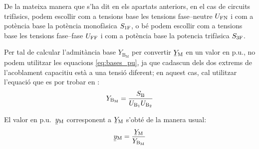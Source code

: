 De la mateixa manera que s'ha dit en els apartats anteriors, en el cas de circuits trif\`{a}sics, podem escollir com a tensions base les tensions fase--neutre $U_\mathrm{FN}$ i com a pot\`{e}ncia base la pot\`{e}ncia  monof\`{a}sica $S_\mathrm{1F}$, o b\'{e} podem escollir com a tensions base les tensions fase--fase $U_\mathrm{FF}$ i com a pot\`{e}ncia base la potencia trif\`{a}sica $S_\mathrm{3F}$.


Per tal de  calcular l'admit\`{a}ncia base $Y_{\text{B}_\text{M}}$ per convertir $\cmplx{Y}\ped{M}$ en un valor en p.u., no podem utilitzar les equacions \eqref{eq:bases_pu}, ja que cadascun dels dos extrems de l'acoblament capacitiu est\`{a} a una tensi\'{o} diferent; en aquest cas, cal utilitzar l'equaci\'{o} que es por trobar en \cite{TLE}:
\begin{equation}
    Y_{\text{B}_\text{M}} = \frac{S_\mathrm{B}}{U_{\text{B}_1} U_{\text{B}_2}}
\end{equation}

El valor en p.u.\ $\cmplx{y}\ped{M}$ corresponent a $\cmplx{Y}\ped{M}$ s'obt\'{e} de la manera usual:
\begin{equation}
    \cmplx{y}\ped{M} = \frac{\cmplx{Y}\ped{M}}{Y_{\text{B}_\text{M}}}
\end{equation}
